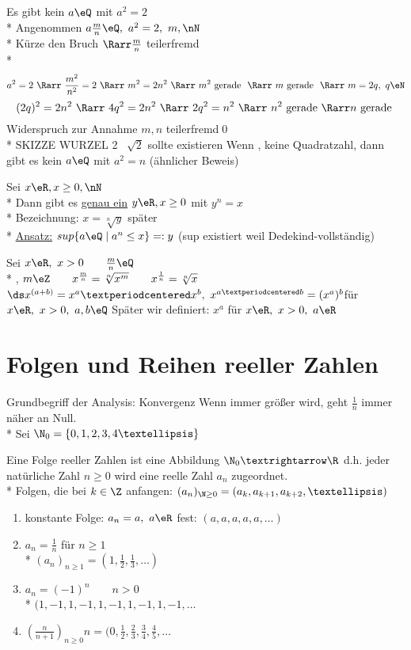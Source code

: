 Es gibt kein $a\eQ$ mit $a^2=2$\\*
\bew
Angenommen $a\frac{m}{n}\eQ,\ a^2=2,\ m,\nN$\\*
Kürze den Bruch $\Rarr \frac{m}{n}$ teilerfremd\\*
$$a^2=2\ \Rarr\ \frac{m^2}{n^2}=2 \ \Rarr\ m^2=2n^2 \ \Rarr\ m^2 \text{ gerade } \ \Rarr\ m \text{ gerade } \ \Rarr\ m=2q,\ q\eN$$
$$(2q)^2=2n^2 \ \Rarr\ 4q^2=2n^2 \ \Rarr\ 2q^2=n^2 \ \Rarr\  n^2 \text{ gerade } \Rarr n \text{ gerade }$$
Widerspruch zur Annahme $m,n$ teilerfremd\qed\\*
SKIZZE WURZEL 2 \Rarr\ $\sqrt{2}$ sollte existieren %
\bem
Wenn \nN, keine Quadratzahl, dann gibt es kein $a\eQ$ mit $a^2=n$ (ähnlicher Beweis)

Sei $x\eR, x\geq 0, \nN$\\*
Dann gibt es \ul{genau ein} $y\eR, x\geq 0$ mit $y^n=x$\\*
Bezeichnung: $x=\sqrt[n]{y}$
\bew
später\\*
\ul{Ansatz:} $sup\{a\eQ\mid a^n\leq x\}=:y$ (sup existiert weil \R{} Dedekind-vollständig)

Sei $x\eR,\ x>0\qquad \frac{m}{n}\eQ$\\*
\nN, $m\eZ\qquad x^{\frac{m}{n}}=\sqrt[n]{x^m}\qquad x^{\frac{1}{n}}=\sqrt[n]{x}$
$\ds x^{(a+b)}=x^a·x^b,\ x^{a·b}=(x^a)^b$\hfill für $x\eR,\ x>0,\ a,b\eQ$
\bem
Später wir definiert: $x^a$ für $x\eR,\ x>0,\ a\eR$

\chapter{Folgen und Reihen reeller Zahlen}
Grundbegriff der Analysis: Konvergenz
\bsp
Wenn \nN{} immer größer wird, geht $\frac{1}{n}$ immer näher an Null.\\*
Sei $\N_0=\{0,1,2,3,4…\}$

Eine Folge reeller Zahlen ist eine Abbildung $\N_0→\R$ d.h. jeder natürliche Zahl $n\geq 0$ wird eine reelle Zahl $a_n$ zugeordnet.\\*
Folgen, die bei $k\in\Z$ anfangen: $(a_n)_{\N\geq 0}=(a_k,a_{k+1},a_{k+2},…)$
\bsp
\begin{enumerate}
\item{konstante Folge: $a_n=a,\ a\eR$ fest: $(a,a,a,a,a,…)$}
\item{$a_n=\frac{1}{n}$ für $n\geq 1$\\*
$(a_n)_{n\geq 1}=(1,\frac{1}{2},\frac{1}{3},…)$}
\item{$a_n=(-1)^n\qquad n>0$\\*
$(1,-1,1,-1,1,-1,1,-1,1,-1,…$}
\item{$(\frac{n}{n+1})_{n\geq 0}n=(0,\frac{1}{2},\frac{2}{3},\frac{3}{4},\frac{4}{5},…$}
\end{enumerate}

